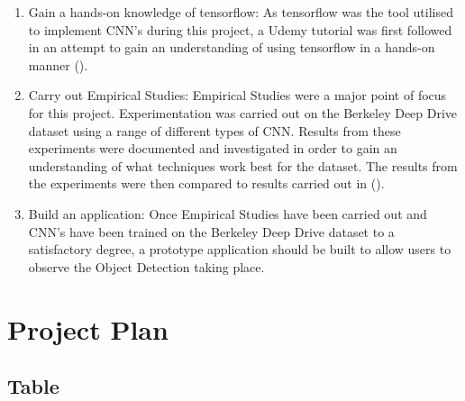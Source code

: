 \documentclass[12pt]{report}
\begin{document}
\begin{flushleft}
\begin{enumerate}
\item Gain a hands-on knowledge of tensorflow: As tensorflow was the tool utilised to implement CNN's during this project, a Udemy tutorial was first followed in an attempt to gain an understanding of using tensorflow in a hands-on manner (\cite{udemy}).
\item Carry out Empirical Studies: Empirical Studies were a major point of focus for this project. Experimentation was carried out on the Berkeley Deep Drive dataset using a range of different types of CNN. Results from these experiments were documented and investigated in order to gain an understanding of what techniques work best for the dataset. The results from the experiments were then compared to results carried out in (\cite{yu2018bdd100k}).
\item Build an application: Once Empirical Studies have been carried out and CNN's have been trained on the Berkeley Deep Drive dataset to a satisfactory degree, a prototype application should be built to allow users to observe the Object Detection taking place.
\end{enumerate}
\end{flushleft}

\newpage
\section{Project Plan}
\subsection{Table}
\vspace{1.5cm}
\end{document}
